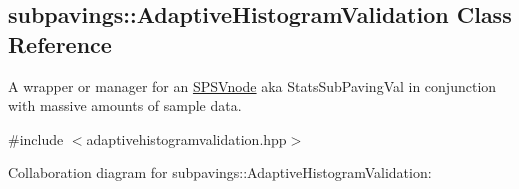 \hypertarget{classsubpavings_1_1AdaptiveHistogramValidation}{\subsection{subpavings\-:\-:\-Adaptive\-Histogram\-Validation \-Class \-Reference}
\label{classsubpavings_1_1AdaptiveHistogramValidation}
}


\-A wrapper or manager for an \hyperlink{classsubpavings_1_1SPSVnode}{\-S\-P\-S\-Vnode} aka \-Stats\-Sub\-Paving\-Val in conjunction with massive amounts of sample data.  




{\ttfamily \#include $<$adaptivehistogramvalidation.\-hpp$>$}



\-Collaboration diagram for subpavings\-:\-:\-Adaptive\-Histogram\-Validation\-:
